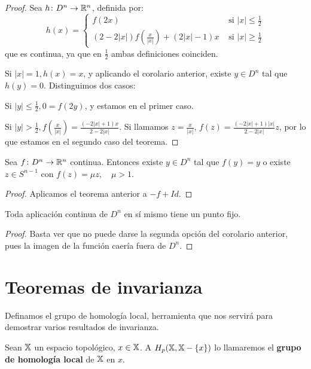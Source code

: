\begin{proof}
  Sea $h \colon D^n \to \mathbb{R}^n$, definida por:
  \[ h(x) = \begin{cases} f(2x) &\text{ si } |x| \leq \frac{1}{2} \\
                          (2-2|x|)f(\frac{x}{|x|}) + (2|x| - 1)x &\text{ si } |x| \geq \frac{1}{2}  \end{cases} \]
  que es continua, ya que en $\frac{1}{2}$ ambas definiciones coinciden.

  Si $|x| = 1, h(x) = x$, y aplicando el corolario anterior, existe $y \in D^n$ tal que $h(y) = 0$. Distinguimos dos casos:

  Si $|y| \leq \frac{1}{2}, 0 = f(2y)$, y estamos en el primer caso.

  Si $|y| > \frac{1}{2}, f(\frac{x}{|x|}) = \frac{(-2|x| + 1)x}{2-2|x|}$. Si llamamos $z = \frac{x}{|x|}$,
  $f(z) = \frac{(-2|x|+1)|x|}{2-2|x|} z$, por lo que estamos en el segundo caso del teorema.
\end{proof}

\begin{corollary}
  Sea $f \colon D^n \to \mathbb{R}^n$ continua. Entonces existe $y \in D^n$ tal que $f(y) = y$ o existe $z \in S^{n-1}$ con $f(z) = \mu z, \quad \mu > 1$.
\end{corollary}

\begin{proof}
  Aplicamos el teorema anterior a $-f + Id$.
\end{proof}

\begin{corollary}
  Toda aplicación continua de $D^n$ en sí mismo tiene un punto fijo.
\end{corollary}

\begin{proof}
  Basta ver que no puede darse la segunda opción del corolario anterior, pues la imagen de la función caería fuera de $D^n$.
\end{proof}

\section{Teoremas de invarianza}

Definamos el grupo de homología local, herramienta que nos servirá para demostrar varios resultados de invarianza.

\begin{definition}
  Sean ${\mathbb X}$ un espacio topológico, $x \in {\mathbb X}$. A $H_p({\mathbb X}, {\mathbb X} - \{x\})$ lo llamaremos el \textbf{grupo de homología local} de ${\mathbb X}$ en $x$.
\end{definition}


